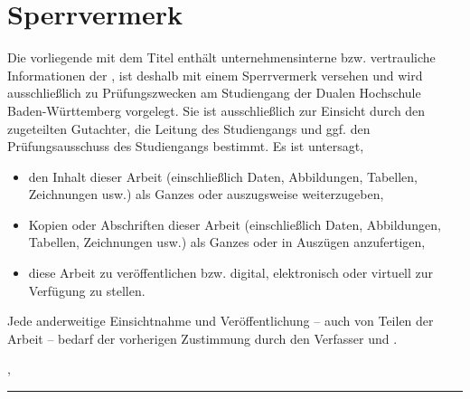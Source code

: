 \thispagestyle{empty}
\section*{Sperrvermerk}

\vspace*{2em}

Die vorliegende {\myArbeit} mit dem Titel {\itshape{} \myTitel{}\/}
enthält unternehmensinterne bzw. vertrauliche Informationen der {\myFirma},
ist deshalb mit einem Sperrvermerk versehen
und wird ausschließlich zu Prüfungszwecken am Studiengang
{\myDegree} der Dualen Hochschule Baden-Württemberg vorgelegt.
Sie ist ausschließlich zur Einsicht durch den zugeteilten Gutachter,
die Leitung des Studiengangs und ggf. den Prüfungsausschuss des Studiengangs
bestimmt.  Es ist untersagt,
\begin{itemize}
\item den Inhalt dieser Arbeit (einschließlich Daten, Abbildungen, Tabellen, Zeichnungen usw.) als Ganzes oder auszugsweise weiterzugeben,
\item Kopien oder Abschriften dieser Arbeit (einschließlich Daten, Abbildungen, Tabellen, Zeichnungen usw.) als Ganzes oder in Auszügen anzufertigen,
\item diese Arbeit zu veröffentlichen bzw. digital, elektronisch oder virtuell zur Verfügung zu stellen.
\end{itemize}
Jede anderweitige Einsichtnahme und Veröffentlichung – auch von Teilen der Arbeit – bedarf der vorherigen Zustimmung durch den Verfasser und {\myFirma}.

\vspace{3em}

\myAbgabeort, \myDatum
\vspace{4em}

\rule{6cm}{0.4pt}\\
\myAutor
